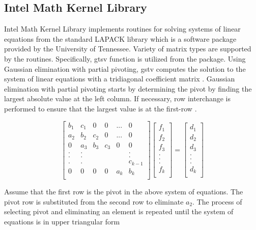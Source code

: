 \documentclass[12pt, oneside]{book}
\theoremstyle{plain}
\theoremstyle{definition}
\begin{document}
\subsection{Intel Math Kernel Library}
Intel Math Kernel Library implements routines for solving systems of linear equations from the standard LAPACK library which is a software package provided by the University of Tennessee. Variety of matrix types are supported by the routines. Specifically, gtsv function is utilized from the package. Using Gaussian elimination with partial pivoting, gstv computes the solution to the system of linear equations with a tridiagonal coefficient matrix \cite{gtsv}.  Gaussian elimination with partial pivoting starts by determining the pivot by finding the largest absolute value at the left column. If necessary, row interchange is performed to ensure that the largest value is at the first-row \cite{gtsvSource}.

$$
\begin{bmatrix}  
b_1 & c_1 & 0 & 0 & ... & 0 \\ 
a_2 & b_2 & c_2 & 0 & ... & 0 \\ 
0 & a_3 & b_3 & c_3 & 0 & 0 \\ 
. & . &  &  &  & . \\ 
. & . &  &  &  & . \\ 
. & . &  &  &  & c_{k-1} \\ 
0 & 0 & 0 & 0 & a_k & b_k \\ 
\end{bmatrix} \begin{bmatrix}  
f_1 \\ 
f_2 \\ 
f_3 \\ 
.\\ 
.\\ 
.\\ 
f_k \\ 
\end{bmatrix} = \begin{bmatrix} 
d_1 \\ 
d_2 \\ 
d_3 \\ 
.\\ 
.\\ 
.\\ 
d_k \\ 
\end{bmatrix}
$$

Assume that the first row is the pivot in the above system of equations. The pivot row is substituted from the second row to eliminate $a_2$. The process of selecting pivot and eliminating an element is repeated until the system of equations is in upper triangular form
\end{document}
